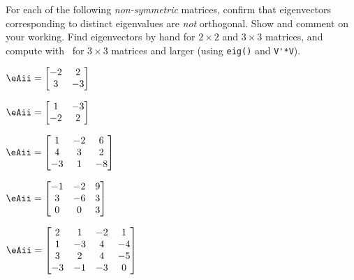 \begin{exercise} \label{ex:smnoevs} 
For each of the following \emph{non-symmetric} matrices, confirm that eigenvectors corresponding to distinct eigenvalues are \emph{not} orthogonal.  Show and comment on your working.
Find eigenvectors by hand for \(2\times 2\) and \(3\times 3\) matrices, and compute with \script\ for \(3\times 3\) matrices and larger (using \verb|eig()| and \verb|V'*V|).
\begin{parts}
\item \(\eAii=\begin{bmatrix} -2&2
\\3&-3 \end{bmatrix}\)

\item \(\eAii=\begin{bmatrix}1&-3
\\-2&2 \end{bmatrix}\)

\item \(\eAii=\begin{bmatrix} 1&-2&6
\\4&3&2
\\-3&1&-8 \end{bmatrix}\)

\item \(\eAii=\begin{bmatrix} -1&-2&9
\\3&-6&3
\\0&0&3 \end{bmatrix}\)


\item \(\eAii=\begin{bmatrix} 2&1&-2&1
\\1&-3&4&-4
\\3&2&4&-5
\\-3&-1&-3&0 \end{bmatrix}\)


\end{parts}
\end{exercise}
